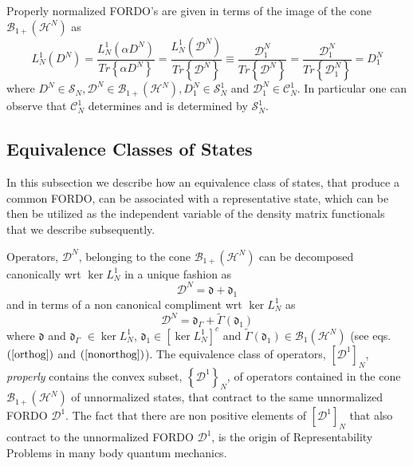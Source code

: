 \documentclass[aps,preprint]{revtex4}%
\begin{document}
Properly normalized FORDO's are given in terms of the image of the cone
$\mathcal{B}_{1+}\left(  \mathcal{H}^{N}\right)  $ as
\begin{equation}
L_{N}^{1}\left(  D^{N}\right)  =\frac{L_{N}^{1}\left(  \alpha D^{N}\right)
}{Tr\left\{  \alpha D^{N}\right\}  }=\frac{L_{N}^{1}\left(  \mathcal{D}%
^{N}\right)  }{Tr\left\{  \mathcal{D}^{N}\right\}  }\equiv\frac{\mathcal{D}%
_{1}^{N}}{Tr\left\{  \mathcal{D}^{N}\right\}  }=\frac{\mathcal{D}_{1}^{N}%
}{Tr\left\{  \mathcal{D}_{1}^{N}\right\}  }=D_{1}^{N}%
\end{equation}
where $D^{N}\in\mathcal{S}_{N},\mathcal{D}^{N}\in\mathcal{B}_{1+}\left(
\mathcal{H}^{N}\right)  ,D_{1}^{N}\in\mathcal{S}_{N}^{1}$ and $\mathcal{D}%
_{1}^{N}\in\mathcal{C}_{N}^{1}$. In particular one can observe that
$\mathcal{C}_{N}^{1}$ determines and is determined by $\mathcal{S}_{N}^{1}$.

\subsection{Equivalence Classes of States}

In this subsection we describe how an equivalence class of states, that
produce a common FORDO, can be associated with a representative state, which
can be then be utilized as the independent variable of the density matrix
functionals that we describe subsequently.

Operators, $\mathcal{D}^{N}$, belonging to the cone $\mathcal{B}_{1+}\left(
\mathcal{H}^{N}\right)  $ can be decomposed canonically wrt $\ker L_{N}^{1}$
in a unique fashion as%
\begin{equation}
\mathcal{D}^{N}=\mathfrak{d}+\mathfrak{d}_{1}%
\end{equation}
and in terms of a non canonical compliment wrt $\ker L_{N}^{1}$ as%
\begin{equation}
\mathcal{D}^{N}=\mathfrak{d}_{\Gamma}+\tilde{\Gamma}\left(  \mathfrak{d}%
_{1}\right)  \label{decomp}%
\end{equation}
where $\mathfrak{d}$ and $\mathfrak{d}_{\Gamma}$ $\in\ker L_{N}^{1}$,
$\mathfrak{d}_{1}\in\left[  \ker L_{N}^{1}\right]  ^{c}$ and $\tilde{\Gamma
}\left(  \mathfrak{d}_{1}\right)  \in\mathcal{B}_{1}\left(  \mathcal{H}%
^{N}\right)  $ (see eqs. $\left(  \ref{orthog}\right)  $ and $\left(
\ref{nonorthog}\right)  $). The equivalence class of operators, $\left[
\mathcal{D}^{1}\right]  _{N}$, \emph{properly} contains the convex subset,
$\left\{  \mathcal{D}^{1}\right\}  _{N}$, of operators contained in the cone
$\mathcal{B}_{1+}\left(  \mathcal{H}^{N}\right)  $ of unnormalized states,
that contract to the same unnormalized FORDO $\mathcal{D}^{1}$. The fact that
there are non positive elements of $\left[  \mathcal{D}^{1}\right]  _{N}$ that
also contract to the unnormalized FORDO $\mathcal{D}^{1}$, is the origin of
Representability Problems \cite{coleman} in many body quantum mechanics.
\end{document}
